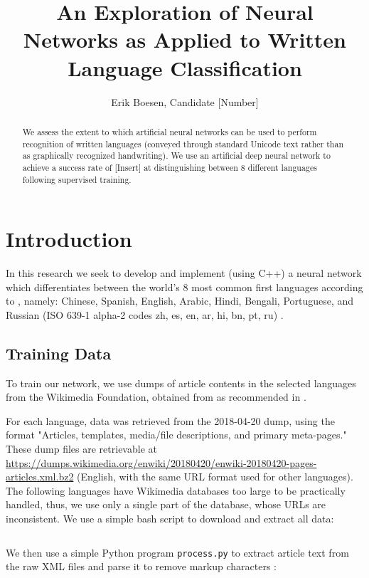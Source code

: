 \documentclass{article}
\begin{document}
\title{An Exploration of Neural Networks as Applied to Written Language Classification}
\author{Erik Boesen, Candidate [Number]}

\maketitle

\begin{abstract}
We assess the extent to which artificial neural networks can be used to perform recognition of written languages (conveyed through standard Unicode text rather than as graphically recognized handwriting). We use an artificial deep neural network to achieve a success rate of [Insert] at distinguishing between 8 different languages following supervised training.
\end{abstract}

\section{Introduction}
In this research we seek to develop and implement (using C++) a neural network which differentiates between the world's 8 most common first languages according to \cite{ethnologue}, namely: Chinese, Spanish, English, Arabic, Hindi, Bengali, Portuguese, and Russian (ISO 639-1 alpha-2 codes zh, es, en, ar, hi, bn, pt, ru) \cite{iso639}.

\subsection{Training Data}
To train our network, we use dumps of article contents in the selected languages from the Wikimedia Foundation, obtained from \cite{wikidumps} as recommended in \cite{langsamp}. %

For each language, data was retrieved from the 2018-04-20 dump, using the format "Articles, templates, media/file descriptions, and primary meta-pages." These dump files are retrievable at \url{https://dumps.wikimedia.org/enwiki/20180420/enwiki-20180420-pages-articles.xml.bz2} (English, with the same URL format used for other languages). The following languages have Wikimedia databases too large to be practically handled, thus, we use only a single part of the database, whose URLs are inconsistent. We use a simple bash script to download and extract all data:
\inputminted{bash}{data/download.sh}

We then use a simple Python program \texttt{process.py} to extract article text from the raw XML files and parse it to remove markup characters \cite{parsewikixml}:
\inputminted{python}{data/process.py}
\end{document}
